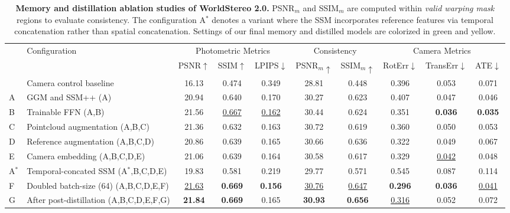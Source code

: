 \documentclass{article} %
\begin{document}
\begin{table}
\centering
\caption{\textbf{Memory and distillation ablation studies of WorldStereo 2.0.} 
PSNR$_m$ and SSIM$_m$ are computed within \textit{valid warping mask} regions to evaluate consistency.
The configuration A$^*$ denotes a variant where the SSM incorporates reference features via temporal concatenation rather than spatial concatenation. 
Settings of our final memory and distilled models are colorized in \textcolor{softgreen}{green} and \textcolor{softyellow}{yellow}.
\label{tab:memory_ablation}}
\fontsize{8.0}{9}\selectfont
\setlength{\tabcolsep}{2.5pt}
\begin{tabular}{llcccccccc}
\toprule
\multirow{2}{*}{} & \multirow{2}{*}{Configuration} & \multicolumn{3}{c}{Photometric Metrics} & \multicolumn{2}{c}{Consistency} & \multicolumn{3}{c}{Camera Metrics}\tabularnewline
\cmidrule(lr){3-5}\cmidrule(lr){6-7}\cmidrule(lr){8-10}
 &  & PSNR$\uparrow$ & SSIM$\uparrow$ & LPIPS$\downarrow$ & PSNR$_{m}\uparrow$ & SSIM$_{m}\uparrow$ & RotErr$\downarrow$ & TransErr$\downarrow$ & ATE$\downarrow$\tabularnewline
 \midrule
 & Camera control baseline & 16.13 & 0.474 & 0.349 & 28.81 & 0.448 & 0.396 & 0.053 & 0.071\tabularnewline
 \midrule
A & GGM and SSM++ (A) & 20.94 & 0.640 & 0.170 & 30.27 & 0.623 & 0.407 & 0.047 & 0.046\tabularnewline
B & Trainable FFN (A,B) & 21.56 & \underline{0.667} & \underline{0.162} & 30.44 & 0.624 & 0.351 & \textbf{0.036} & \textbf{0.035}\tabularnewline
C & Pointcloud augmentation (A,B,C) & 21.36 & 0.632 & 0.163 & 30.72 & 0.619 & 0.360 & 0.050 & 0.053\tabularnewline
D & Reference augmentation (A,B,C,D) & 20.86 & 0.639 & 0.165 & 30.66 & 0.636 & 0.322 & 0.049 & 0.067\tabularnewline
E & Camera embedding (A,B,C,D,E) & 21.06 & 0.639 & 0.164 & 30.58 & 0.617 & 0.329 & \underline{0.042} & 0.048\tabularnewline
A$^*$ & Temporal-concated SSM (A$^*$,B,C,D,E) & 19.83 & 0.581 & 0.219 & 29.77 & 0.571 & 0.545 & 0.087 & 0.114\tabularnewline
\rowcolor{rowgreen}
F & Doubled batch-size (64) (A,B,C,D,E,F) & \underline{21.63} & \textbf{0.669} & \textbf{0.156} & \underline{30.76} & \underline{0.647} & \textbf{0.296} & \textbf{0.036} & \underline{0.041}\tabularnewline
\midrule
\rowcolor{rowyellow}
G & After post-distillation (A,B,C,D,E,F,G) & \textbf{21.84} & \textbf{0.669} & 0.165 & \textbf{30.93} & \textbf{0.656} & \underline{0.316} & 0.052 & 0.072\tabularnewline
\bottomrule
\end{tabular}
\end{table}
\end{document}
